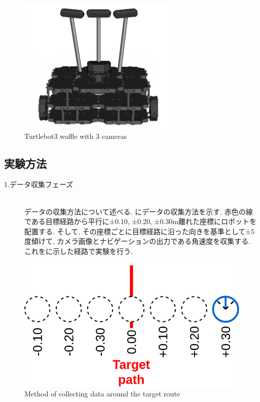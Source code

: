 \begin{figure}[h]
  \centering
  \includegraphics[keepaspectratio, scale=0.55]{images/turtlebot3.png}
  \caption{Turtlebot3 waffle with 3 cameras}
  \label{Fig:turtlebot3}
  \end{figure}

\newpage
\subsection{実験方法}
\begin{description}
  \item[1.データ収集フェーズ]\mbox{}\\データの収集方法について述べる. にデータの収集方法を示す. 赤色の線である目標経路から平行に±0.10, ±0.20, ±0.30m離れた座標にロボットを配置する. そして, その座標ごとに目標経路に沿った向きを基準として±5度傾けて, カメラ画像とナビゲーションの出力である角速度を収集する. これをに示した経路で実験を行う. 
\end{description}

\begin{figure}[h]
  \centering
  \includegraphics[keepaspectratio, scale=0.25]{images/old-method.png}
  \caption{Method of collecting data around the target route}
  \label{Fig:old-method}
  \end{figure}

